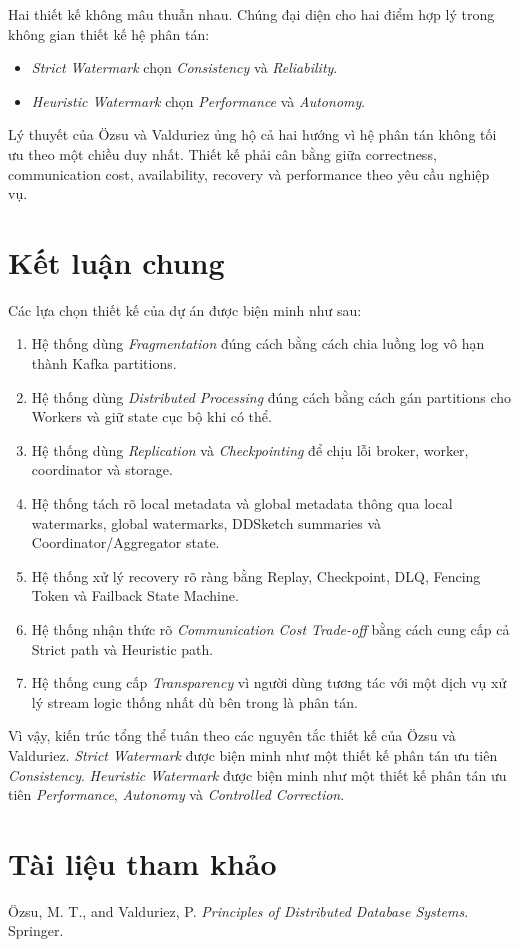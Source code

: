 \documentclass[12pt,a4paper]{article}
\begin{document}
Hai thiết kế không mâu thuẫn nhau. Chúng đại diện cho hai điểm hợp lý trong không gian thiết kế hệ phân tán:

\begin{itemize}
    \item \textit{Strict Watermark} chọn \textit{Consistency} và \textit{Reliability}.
    \item \textit{Heuristic Watermark} chọn \textit{Performance} và \textit{Autonomy}.
\end{itemize}

Lý thuyết của Özsu và Valduriez ủng hộ cả hai hướng vì hệ phân tán không tối ưu theo một chiều duy nhất. Thiết kế phải cân bằng giữa correctness, communication cost, availability, recovery và performance theo yêu cầu nghiệp vụ.

\section{Kết luận chung}

Các lựa chọn thiết kế của dự án được biện minh như sau:

\begin{enumerate}
    \item Hệ thống dùng \textit{Fragmentation} đúng cách bằng cách chia luồng log vô hạn thành Kafka partitions.
    \item Hệ thống dùng \textit{Distributed Processing} đúng cách bằng cách gán partitions cho Workers và giữ state cục bộ khi có thể.
    \item Hệ thống dùng \textit{Replication} và \textit{Checkpointing} để chịu lỗi broker, worker, coordinator và storage.
    \item Hệ thống tách rõ local metadata và global metadata thông qua local watermarks, global watermarks, DDSketch summaries và Coordinator/Aggregator state.
    \item Hệ thống xử lý recovery rõ ràng bằng Replay, Checkpoint, DLQ, Fencing Token và Failback State Machine.
    \item Hệ thống nhận thức rõ \textit{Communication Cost Trade-off} bằng cách cung cấp cả Strict path và Heuristic path.
    \item Hệ thống cung cấp \textit{Transparency} vì người dùng tương tác với một dịch vụ xử lý stream logic thống nhất dù bên trong là phân tán.
\end{enumerate}

Vì vậy, kiến trúc tổng thể tuân theo các nguyên tắc thiết kế của Özsu và Valduriez. \textit{Strict Watermark} được biện minh như một thiết kế phân tán ưu tiên \textit{Consistency}. \textit{Heuristic Watermark} được biện minh như một thiết kế phân tán ưu tiên \textit{Performance}, \textit{Autonomy} và \textit{Controlled Correction}.

\section{Tài liệu tham khảo}

Özsu, M. T., and Valduriez, P. \textit{Principles of Distributed Database Systems}. Springer.
\end{document}
